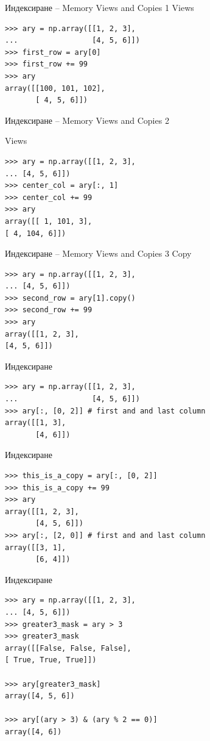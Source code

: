 \documentclass{beamer}
\begin{document}
\begin{frame}[fragile]{Индексиране – Memory Views and Copies 1}
Views
\begin{verbatim}
>>> ary = np.array([[1, 2, 3],
...                 [4, 5, 6]])
>>> first_row = ary[0]
>>> first_row += 99
>>> ary
array([[100, 101, 102],
       [ 4, 5, 6]])
\end{verbatim}
\end{frame}

\begin{frame}[fragile]{Индексиране – Memory Views and Copies 2}

Views
\begin{verbatim}
>>> ary = np.array([[1, 2, 3],
... [4, 5, 6]])
>>> center_col = ary[:, 1]
>>> center_col += 99
>>> ary
array([[ 1, 101, 3],
[ 4, 104, 6]])
\end{verbatim}
\end{frame}

\begin{frame}[fragile]{Индексиране – Memory Views and Copies 3}
Copy
\begin{verbatim}
>>> ary = np.array([[1, 2, 3],
... [4, 5, 6]])
>>> second_row = ary[1].copy()
>>> second_row += 99
>>> ary
array([[1, 2, 3],
[4, 5, 6]])
\end{verbatim}
Индексиране
\begin{verbatim}
>>> ary = np.array([[1, 2, 3],
...                 [4, 5, 6]])
>>> ary[:, [0, 2]] # first and and last column
array([[1, 3],
       [4, 6]])
\end{verbatim}
\end{frame}

\begin{frame}[fragile]{Индексиране }
\begin{verbatim}
>>> this_is_a_copy = ary[:, [0, 2]]
>>> this_is_a_copy += 99
>>> ary
array([[1, 2, 3],
       [4, 5, 6]])
>>> ary[:, [2, 0]] # first and and last column
array([[3, 1],
       [6, 4]])
\end{verbatim}
\end{frame}

\begin{frame}[fragile]{Индексиране }
\begin{verbatim}
>>> ary = np.array([[1, 2, 3],
... [4, 5, 6]])
>>> greater3_mask = ary > 3
>>> greater3_mask
array([[False, False, False],
[ True, True, True]])

>>> ary[greater3_mask]
array([4, 5, 6])

>>> ary[(ary > 3) & (ary % 2 == 0)]
array([4, 6])
\end{verbatim}
\end{frame}
\end{document}
